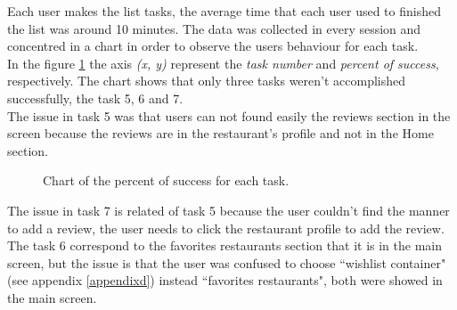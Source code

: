 Each user makes the list tasks, the average time that each user used
to finished the list was around 10 minutes. The data was collected in
every session and concentred in a chart in order to observe the users
behaviour for each task. \\ In the figure \ref{fig:tsuccess} the axis 
\textit{(x, y)} represent the \textit{task number} and \textit{percent 
of success},  respectively. The chart shows that only
three tasks weren't accomplished successfully, the task 5, 6 and 7. \\ 
The issue in task 5 was that users can not found easily the reviews
section in the screen because the reviews are in the restaurant’s
profile and not in the Home section. 
\begin{figure}
\centering
\captionsetup{font=footnotesize}
\caption{Chart of the percent of success for each task.}
\label{fig:tsuccess}   
\end{figure}
The issue in task 7 is related of
task 5 because the user couldn’t find the manner to add a review, the
user needs to click the restaurant profile to add the review. The task
6 correspond to the favorites restaurants section that it is in the
main screen, but the issue is that the user was confused to choose
``wishlist container" (see appendix \ref{appendixd}) instead 
``favorites restaurants", both were showed in the main screen. \\ 
